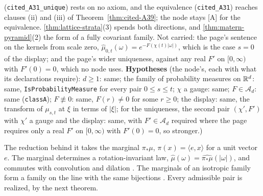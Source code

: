 \begin{theorem}
{(\texttt{cited\_A31\_unique}) rests on no axiom, and the equivalence (\texttt{cited\_A31}) reaches
clauses (ii) and (iii) of Theorem~\ref{thm:cited-A39}; the node stays [A] for the equivalence. \ref{thm:lattice-strata}(3) spends both directions, and
\ref{thm:matern-pyramid}(2) the form of a fully covariant family. Not carried: the page's sentence
on the kernels from scale zero, $\widehat\mu_{0,t}(\omega) = e^{-F(\chi(t)|\omega|)}$, which is
the case $s = 0$ of the display; and the page's wider uniqueness, against any real $F'$ on
$[0,\infty)$ with $F'(0) = 0$, which no node uses.
\textbf{Hypotheses} (the node's, each with what its declarations require): $d \ge 1$: same; the family
of probability measures on $\mathbb{R}^d$: same, \texttt{IsProbabilityMeasure} for every pair
$0 \le s \le t$; $\chi$ a gauge: same; $F \in \mathcal{A}_d$: same (\texttt{classA}); $F \not\equiv 0$:
same, $F(r) \ne 0$ for some $r \ge 0$; the display: same, the transform of $\mu_{s,t}$ at $\xi$ in
terms of $|\xi|$; for the uniqueness, the second pair $(\chi', F')$ with $\chi'$ a gauge and the
display: same, with $F' \in \mathcal{A}_d$ required where the page requires only a real $F'$ on $[0,\infty)$
with $F'(0) = 0$, so stronger.)}
\end{theorem}

The reduction behind it  takes the marginal $\pi_*\mu$,
$\pi(x) = \langle e, x\rangle$ for a unit vector $e$. The marginal determines a rotation-invariant
law, $\widehat\mu(\omega) = \widehat{\pi_*\mu}(|\omega|)$, and commutes with convolution and
dilation . The marginals of an isotropic family form a family
on the line with the same bijections . Every admissible pair is
realized, by the next theorem.


